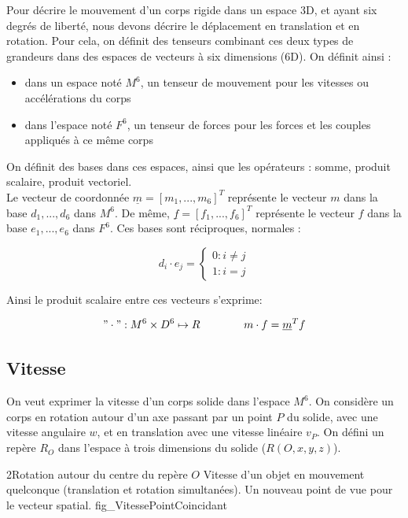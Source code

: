 \documentclass{report}
\begin{document}
Pour décrire le mouvement d'un corps rigide dans un espace 3D, et ayant six degrés de liberté, nous devons décrire le déplacement en translation et en rotation. Pour cela, on définit des tenseurs combinant ces deux types de grandeurs dans des espaces de vecteurs à six dimensions (6D). On définit ainsi :\\
\begin{itemize}
\item dans un espace noté $M^{6}$, un tenseur de mouvement pour les vitesses ou accélérations du corps
\item dans l'espace noté $F^{6}$, un tenseur de forces pour les forces et les couples appliqués à ce même corps
\end{itemize}
On définit des bases dans ces espaces, ainsi que les opérateurs : somme, produit scalaire, produit vectoriel.\\
Le vecteur de coordonnée $\underline{m}=[m_{1},...,m_{6}]^T$ représente le vecteur $m$ dans la base ${d_{1},...,d_{6}}$ dans $M^{6}$.
De même, $\underline{f}=[f_{1},...,f_{6}]^T$ représente le vecteur $f$ dans la base ${e_{1},...,e_{6}}$ dans $F^{6}$.
Ces bases sont réciproques, normales :

$$
d_{i}\cdot e_{j}=
\begin{cases}
0 \colon i \neq j\\
1 \colon i = j
\end{cases}
$$

Ainsi le produit scalaire entre ces vecteurs s'exprime:

$$
"\cdot" : M^{6} \times D^{6} \mapsto R
\qquad
\qquad
m \cdot f = \underline{m}^T f
$$

\subsection{Vitesse}\label{ch_algSpa_Vitesse}

On veut exprimer la vitesse d'un corps solide dans l'espace $M^{6}$. On considère un corps en rotation autour d'un axe passant par un point $P$ du solide, avec une vitesse angulaire $w$, et en translation avec une vitesse linéaire $v_{P}$. On défini un repère $R_{O}$ dans l'espace à trois dimensions du solide ($R(O,x,y,z)$).

{2}{Rotation autour du centre du repère $O$}
{Vitesse d'un objet en mouvement quelconque (translation et rotation simultanées). Un nouveau point de vue pour le vecteur spatial.}
{fig_VitessePointCoincidant}
\end{document}
